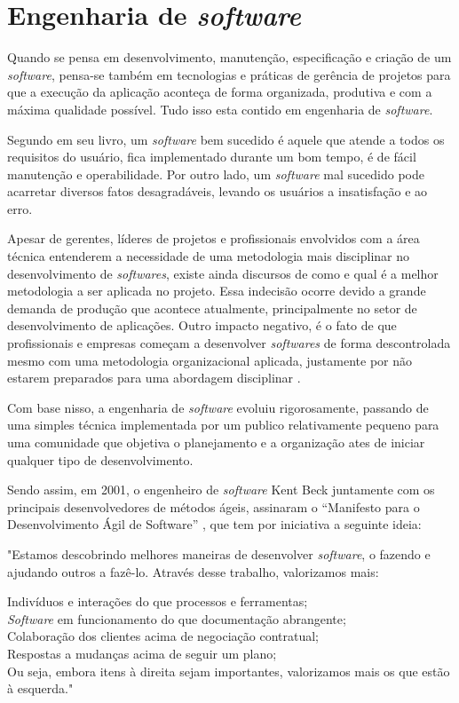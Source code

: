 \section{\textbf{{Engenharia de \textit{software}}}}
\label{engenharia-software}

Quando se pensa em desenvolvimento, manutenção, especificação e criação de um \textit{software}, pensa-se também em tecnologias e práticas de gerência de projetos para que a execução da aplicação aconteça de forma organizada, produtiva e com a máxima qualidade possível. Tudo isso esta contido em engenharia de \textit{software}.

Segundo  em seu livro, um \textit{software} bem sucedido é aquele que atende a todos os requisitos do usuário, fica implementado durante um bom tempo, é de fácil manutenção e operabilidade. Por outro lado, um \textit{software} mal sucedido pode acarretar diversos fatos desagradáveis, levando os usuários a insatisfação e ao erro. 

Apesar de gerentes, líderes de projetos e profissionais envolvidos com a área técnica entenderem a necessidade de uma metodologia mais disciplinar no desenvolvimento de \textit{softwares}, existe ainda discursos de como e qual é a melhor metodologia a ser aplicada no projeto. Essa indecisão ocorre devido a grande demanda de produção que acontece atualmente, principalmente no setor de desenvolvimento de aplicações. Outro impacto negativo, é o fato de que profissionais e empresas começam a desenvolver \textit{softwares} de forma descontrolada mesmo com uma metodologia organizacional aplicada, justamente por não estarem preparados para uma abordagem disciplinar \cite{PRESSMAN2016}. 

Com base nisso, a engenharia de \textit{software} evoluiu rigorosamente, passando de uma simples técnica implementada por um publico relativamente pequeno para uma comunidade que objetiva o planejamento e a organização ates de iniciar qualquer tipo de desenvolvimento.

Sendo assim, em 2001, o engenheiro de \textit{software} Kent Beck juntamente com os principais
desenvolvedores de métodos ágeis, assinaram o “Manifesto para o Desenvolvimento Ágil de Software” \cite{SOMMERVILLE2011}, que tem por iniciativa a seguinte ideia:

\begin{citacao}
"Estamos descobrindo melhores maneiras de desenvolver \textit{software}, o fazendo e ajudando outros a fazê-lo. Através desse trabalho, valorizamos mais:

Indivíduos e interações do que processos e ferramentas;\\
\textit{Software} em funcionamento do que documentação abrangente;\\
Colaboração dos clientes acima de negociação contratual;\\
Respostas a mudanças acima de seguir um plano;\\
Ou seja, embora itens à direita sejam importantes, valorizamos mais os que estão à esquerda.\cite{SOMMERVILLE2011}"
\end{citacao}



